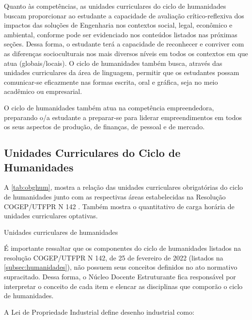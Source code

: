Quanto às competências, as unidades curriculares do ciclo de humanidades buscam proporcionar ao estudante a capacidade de avaliação crítico-reflexiva dos impactos das soluções de Engenharia nos contextos social, legal, econômico e ambiental, conforme pode ser evidenciado nos conteúdos listados nas próximas seções. Dessa forma, o estudante terá a capacidade de reconhecer e conviver com as diferenças socioculturais nos mais diversos níveis em todos os contextos em que atua (globais/locais). O ciclo de humanidades também busca, através das unidades curriculares da área de linguagem, permitir que os estudantes possam  comunicar-se eficazmente nas formas escrita, oral e gráfica, seja no meio acadêmico ou empresarial.

O ciclo de humanidades também atua na competência empreendedora, preparando o/a estudante a preparar-se para liderar empreendimentos em todos os seus aspectos de produção, de finanças, de pessoal e de mercado.

\subsection{Unidades Curriculares do Ciclo de Humanidades}
\label{subsec:obghumanidades}

A \autoref{tab:obghum}, mostra a relação das unidades curriculares obrigatórias do ciclo de humanidades junto com as respectivas áreas estabelecidas na Resolução COGEP/UTFPR N\textordmasculine{} 142 \cite{cogep142}. Também mostra o quantitativo de carga horária de unidades curriculares optativas.

\begin{table}[!htb]
	\centering\footnotesize
	\caption{Unidades curriculares de humanidades}
	\label{tab:obghum}
\end{table}

É importante ressaltar que os componentes do ciclo de humanidades listados na resolução COGEP/UTFPR N\textordmasculine{} 142, de 25 de fevereiro de 2022 \cite{cogep142} (listados na \autoref{subsec:humanidades}), não possuem seus conceitos definidos no ato normativo supracitado. Dessa forma, o Núcleo Docente Estruturante fica responsável por interpretar o conceito de cada item e elencar as disciplinas que comporão o ciclo de humanidades.

A Lei de Propriedade Industrial define desenho industrial como:

